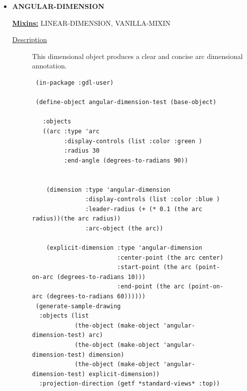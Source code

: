 \documentclass [11pt]{book}
\begin{document}
\begin{itemize}

\item {}
\label{prim:angular-dimension}
\textbf{ANGULAR-DIMENSION}


\textbf{
\underline{Mixins:}} LINEAR-DIMENSION, VANILLA-MIXIN





\begin{description}

\item [
\underline{Description}]


This dimensional object produces a clear and concise arc dimensional annotation.



\end{description}




\begin{figure}
\begin{lrbox}{\boxedverb}
\begin{minipage}{\linewidth}
{\small

\begin{verbatim}
 (in-package :gdl-user)

 (define-object angular-dimension-test (base-object) 
   
   :objects 
   ((arc :type 'arc
         :display-controls (list :color :green )
         :radius 30
         :end-angle (degrees-to-radians 90))
    
    
    (dimension :type 'angular-dimension
               :display-controls (list :color :blue )
               :leader-radius (+ (* 0.1 (the arc radius))(the arc radius))
               :arc-object (the arc))
    
    (explicit-dimension :type 'angular-dimension
                        :center-point (the arc center)
                        :start-point (the arc (point-on-arc (degrees-to-radians 10)))
                        :end-point (the arc (point-on-arc (degrees-to-radians 60))))))
 (generate-sample-drawing 
  :objects (list 
            (the-object (make-object 'angular-dimension-test) arc) 
            (the-object (make-object 'angular-dimension-test) dimension)
            (the-object (make-object 'angular-dimension-test) explicit-dimension))
  :projection-direction (getf *standard-views* :top))
 
  
\end{verbatim}}
\end{minipage}
\end{lrbox}
\fbox{\usebox{\boxedverb}}


\end{figure}
\end{itemize}
\end{document}
